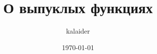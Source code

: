 


\title{О выпуклых функциях}
\def\subtitle{....}
\def\edition{[articles]\ \#\ 1}
\author{kalaider}
\date{\today}


	
	\ifdefined\usetitle
	    
	\fi
	
	

